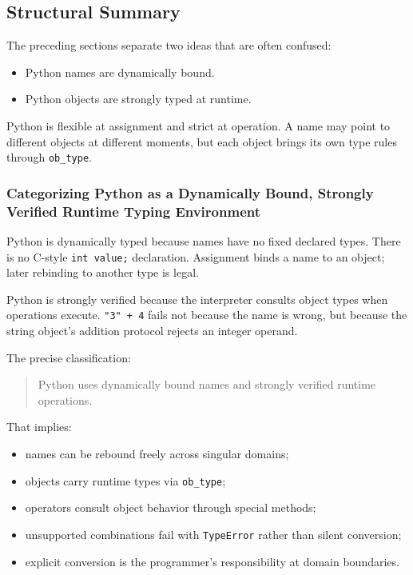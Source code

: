 \subsection{Structural Summary}

The preceding sections separate two ideas that are often confused:

\begin{itemize}
    \item Python names are dynamically bound.
    \item Python objects are strongly typed at runtime.
\end{itemize}

Python is flexible at assignment and strict at operation. A name may point to different objects at different moments, but each object brings its own type rules through \texttt{ob\_type}.

\subsubsection{Categorizing Python as a Dynamically Bound, Strongly Verified Runtime Typing Environment}

Python is dynamically typed because names have no fixed declared types. There is no C-style \texttt{int value;} declaration. Assignment binds a name to an object; later rebinding to another type is legal.

Python is strongly verified because the interpreter consults object types when operations execute. \texttt{"3" + 4} fails not because the name is wrong, but because the string object's addition protocol rejects an integer operand.

The precise classification:

\begin{quote}
Python uses dynamically bound names and strongly verified runtime operations.
\end{quote}

That implies:

\begin{itemize}
    \item names can be rebound freely across singular domains;
    \item objects carry runtime types via \texttt{ob\_type};
    \item operators consult object behavior through special methods;
    \item unsupported combinations fail with \texttt{TypeError} rather than silent conversion;
    \item explicit conversion is the programmer's responsibility at domain boundaries.
\end{itemize}

